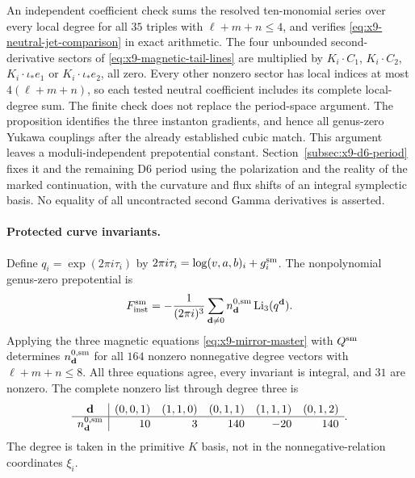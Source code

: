An independent coefficient check sums the resolved ten-monomial
series over every local degree for all $35$ triples with
$\ell+m+n\leq4$, and verifies
\eqref{eq:x9-neutral-jet-comparison} in exact arithmetic.
The four unbounded second-derivative sectors of
\eqref{eq:x9-magnetic-tail-lines} are multiplied by
$K_i\cdot C_1$, $K_i\cdot C_2$, $K_i\cdot\iota_*e_1$ or
$K_i\cdot\iota_*e_2$, all zero. Every other nonzero sector has
local indices at most $4(\ell+m+n)$, so each tested neutral
coefficient includes its complete local-degree sum. The finite check does not replace the period-space argument.
The proposition identifies the three instanton gradients, and hence
all genus-zero Yukawa couplings after the already established cubic
match. This argument leaves a moduli-independent prepotential constant.
Section~\ref{subsec:x9-d6-period} fixes it and the remaining D6 period
using the polarization and the reality of the marked continuation,
with the curvature and flux shifts of an integral symplectic basis.
No equality of all uncontracted second Gamma derivatives is asserted.

\paragraph{Protected curve invariants.}
Define $q_i=\exp(2\pi i\tau_i)$ by
$2\pi i\tau_i=\log(v,a,b)_i+g^{\rm sm}_i$.
The nonpolynomial genus-zero prepotential is
\begin{equation}
 F^{\rm sm}_{\rm inst}
 =-\frac1{(2\pi i)^3}\sum_{\mathbf d\ne0}
       n^{0,\rm sm}_{\mathbf d}\operatorname{Li}_3(q^{\mathbf d}).
 \label{eq:x9-neutral-instanton-prepotential}
\end{equation}
Applying the three magnetic equations
\eqref{eq:x9-mirror-master} with $Q^{\rm sm}$ determines
$n^{0,\rm sm}_{\mathbf d}$ for all $164$ nonzero nonnegative
degree vectors with $\ell+m+n\leq8$. All three equations agree,
every invariant is integral, and $31$ are nonzero. The complete
nonzero list through degree three is
\begin{equation}
 \begin{array}{c|rrrrr}
 \mathbf d&(0,0,1)&(1,1,0)&(0,1,1)&(1,1,1)&(0,1,2)\\\hline
 n^{0,\rm sm}_{\mathbf d}&10&3&140&-20&140
 \end{array}.
 \label{eq:x9-neutral-gv-low}
\end{equation}
The degree is taken in the primitive $K$ basis, not in
the nonnegative-relation coordinates $\xi_i$.


